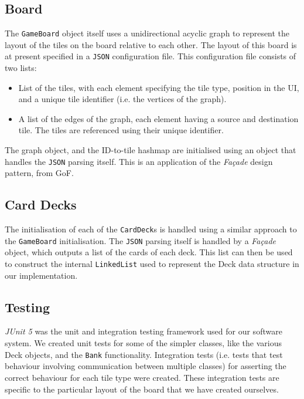 \documentclass[a4paper, 11pt]{article}
\begin{document}
	\subsection*{Board}
	The \texttt{GameBoard} object itself uses a unidirectional acyclic graph to represent the layout of the tiles on the board relative to each other. The layout of this board is at present specified in a \texttt{JSON} configuration file. This configuration file consists of two lists:\\
	\begin{itemize}
	\item List of the tiles, with each element specifying the tile type, position in the UI, and a unique tile identifier (i.e. the vertices of the graph).
	\item A list of the edges of the graph, each element having a source and destination tile. The tiles are referenced using their unique identifier.
	\end{itemize}	
	The graph object, and the ID-to-tile hashmap are initialised using an object that handles the \texttt{JSON} parsing itself. This is an application of the \textit{Fa\c{c}ade} design pattern, from GoF.\\
	\subsection*{Card Decks}
	The initialisation of each of the \texttt{CardDeck}s is handled using a similar approach to the \texttt{GameBoard} initialisation. The \texttt{JSON} parsing itself is handled by a \textit{Fa\c{c}ade} object, which outputs a list of the cards of each deck. This list can then be used to construct the internal \texttt{LinkedList} used to represent the Deck data structure in our implementation.
	\subsection*{Testing}
	\textit{JUnit 5} was the unit and integration testing framework used for our software system. We created unit tests for some of the simpler classes, like the various Deck objects, and the \texttt{Bank} functionality.
	Integration tests (i.e. tests that test behaviour involving communication between multiple classes) for asserting the correct behaviour for each tile type were created. These integration tests are specific to the particular layout of the board that we have created ourselves.
	
	
\end{document}
